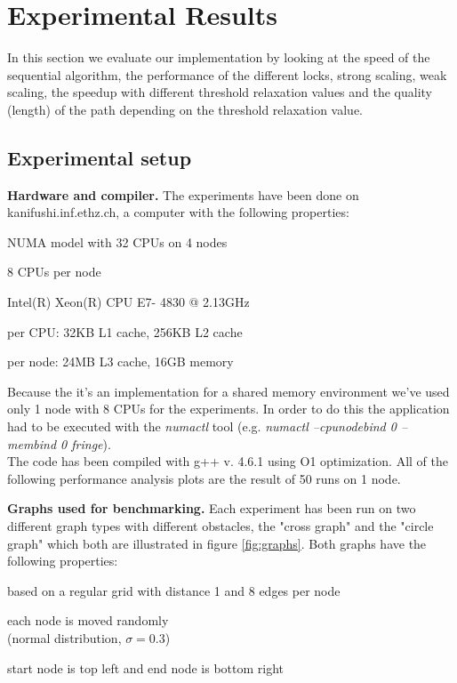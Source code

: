 \documentclass[letterpaper]{article}
\newcommand{\mypar}[1]{{\bf #1.}}
\begin{document}
\section{Experimental Results}\label{sec:exp}

In this section we evaluate our implementation by looking at the speed of the sequential algorithm, the performance of the different locks, strong scaling, weak scaling, the speedup with different threshold relaxation values and the quality (length) of the path depending on the threshold relaxation value.

\subsection{Experimental setup}\label{ssec:setup}

\mypar{Hardware and compiler}
The experiments have been done on kanifushi.inf.ethz.ch, a computer with the following properties:
\begin{compactitem}
\item NUMA model with 32 CPUs on 4 nodes
\item 8 CPUs per node
\item Intel(R) Xeon(R) CPU E7- 4830 @ 2.13GHz
\item per CPU: 32KB L1 cache, 256KB L2 cache
\item per node: 24MB L3 cache, 16GB memory
\end{compactitem}
Because the it's an implementation for a shared memory environment we've used only 1 node with 8 CPUs for the experiments. In order to do this the application had to be executed with the \textit{numactl} tool (e.g. \textit{numactl --cpunodebind 0 --membind 0 fringe}).\\
The code has been compiled with g++ v. 4.6.1 using O1 optimization. All of the following performance analysis plots are the result of 50 runs on 1 node.

\mypar{Graphs used for benchmarking}
Each experiment has been run on two different graph types with different obstacles, the "cross graph" and the "circle graph" which both are illustrated in figure \ref{fig:graphs}. Both graphs have the following properties:
\begin{compactitem}
\item based on a regular grid with distance 1 and 8 edges per node
\item each node is moved randomly\\(normal distribution, $\sigma = 0.3$)
\item start node is top left and end node is bottom right
\end{compactitem}
\end{document}

